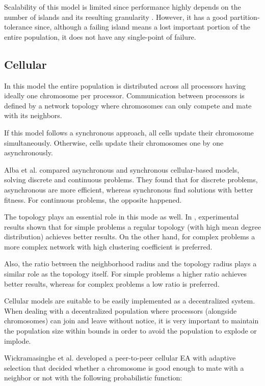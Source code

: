 Scalability of this model is limited since performance highly depends on the number of islands and its resulting granularity \cite{58}. However, it has a good partition-tolerance since, although a failing island means a lost important portion of the entire population, it does not have any single-point of failure.

\subsection{Cellular}
In this model the entire population is distributed across all processors having ideally one chromosome per processor. Communication between processors is defined by a network topology where chromosomes can only compete and mate with its neighbors.

If this model follows a synchronous approach, all cells update their chromosome simultaneously. Otherwise, cells update their chromosomes one by one asynchronously.

Alba et al. \cite{2} compared asynchronous and synchronous cellular-based models, solving discrete and continuous problems. They found that for discrete problems, asynchronous are more efficient, whereas synchronous find solutions with better fitness. For continuous problems, the opposite happened.

The topology plays an essential role in this mode as well. In \cite{68}, experimental results shown that for simple problems a regular topology (with high mean degree distribution) achieves better results. On the other hand, for complex problems a more complex network with high clustering coefficient is preferred.

Also, the ratio between the neighborhood radius and the topology radius plays a similar role as the topology itself. For simple problems a higher ratio achieves better results, whereas for complex problems a low ratio is preferred.\cite{5}

Cellular models are suitable to be easily implemented as a decentralized system. When dealing with a decentralized population where processors (alongside chromosomes) can join and leave without notice, it is very important to maintain the population size within bounds in order to avoid the population to explode or implode. 

Wickramasinghe et al. \cite{p2p-ea} developed a peer-to-peer cellular EA with adaptive selection that decided whether a chromosome is good enough to mate with a neighbor or not with the following probabilistic function:

